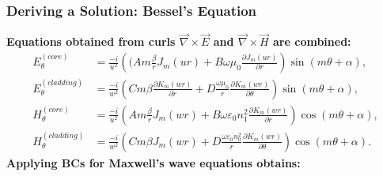 \documentclass{beamer}
\begin{document}
\begin{frame}
\frametitle{\textbf{Deriving a Solution:} Bessel's Equation}
\textbf{Equations obtained from curls $\vec{\nabla}\times\vec{E}$ and $\vec{\nabla}\times\vec{H}$ are combined:}
{\small \begin{align*}
E_\theta^{(core)}&=\frac{-i}{u^2}\left((Am\frac{\beta}{r}J_m(ur)+B\omega\mu_0\frac{\partial J_m(ur)}{\partial r}\right)\sin{(m\theta+\alpha)},\\
E_\theta^{(cladding)}&=\frac{-i}{w^2}\left(Cm\beta\frac{\partial K_m(wr)}{\partial r}+D\frac{\omega\mu_0}{r}\frac{\partial K_m(wr)}{\partial\theta}\right)\sin{(m\theta+\alpha)},\\
H_\theta^{(core)}&=\frac{-i}{u^2}\left(Am\frac{\beta}{r}J_m(wr)+B\omega\varepsilon_0 n_1^2\frac{\partial K_m(wr)}{\partial r}\right)\cos{(m\theta+\alpha)},\\
H_\theta^{(cladding)}&=\frac{-i}{w^2}\left(Cm\beta J_m(wr)+D\frac{\omega\varepsilon_0 n_0^2}{r}\frac{\partial K_m(wr)}{\partial\theta}\right)\cos{(m\theta+\alpha)}.
\end{align*}}
\textbf{Applying BCs for Maxwell's wave equations obtains:}
\end{frame}
\end{document}

